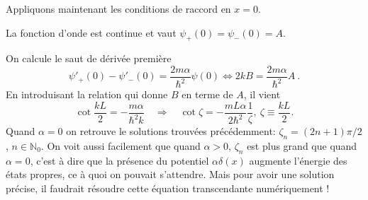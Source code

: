 \begin{enumerate}
{Appliquons maintenant les conditions de raccord en $x=0$. 

La fonction d'onde est 
 continue et vaut $\psi_+ (0) = \psi_- (0) = A$. 
 
On calcule le saut de dérivée première
\begin{equation}
\psi'_+ (0) - \psi'_- (0) = \frac{2m\alpha}{\hbar^2} \psi(0) \Leftrightarrow 2kB = \frac{2m\alpha}{\hbar^2} A \ .
\end{equation}
En introduisant la relation qui donne $B$ en terme de $A$, il vient
\begin{equation}
\cot \frac{kL}{2} =- \frac{m\alpha}{\hbar^2 k} \quad \Rightarrow\quad \boxed{ \cot\zeta = - \frac{m L\alpha} {2 \hbar^2}\frac{1}{\zeta},\ \zeta\equiv \frac{kL}{2}. }
\end{equation}
Quand $\alpha=0$ on retrouve le solutions trouvées précédemment: $\zeta_n = (2n+1) \pi/2$, $n\in\mathbb{N}_0$. On voit aussi facilement que quand $\alpha>0$, $\zeta_n$ est plus grand que quand $\alpha=0$, c'est à dire que la présence du potentiel $\alpha \delta(x)$ augmente l'énergie des états propres, ce à quoi on pouvait s'attendre. Mais pour avoir une solution précise, il faudrait résoudre cette équation transcendante numériquement ! 
}
\end{enumerate}